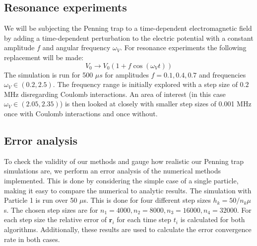 \documentclass[english,notitlepage,reprint,nofootinbib]{revtex4-1}  %
\begin{document}
\subsection*{Resonance experiments}
We will be subjecting the Penning trap to a time-dependent electromagnetic field by adding a time-dependent perturbation
to the electric potential with a constant amplitude $f$ and angular frequency $\omega_V$. For resonance experiments the
following replacement will be made:
\begin{equation}
    V_0 \rightarrow V_0 (1 + f \cos(\omega_V t) )
\end{equation}
The simulation is run for 500 $\mu s$ for amplitudes $ f = 0.1, 0.4, 0.7$ and frequencies $\omega_V \in (0.2,2.5)$. The frequency
range is initially explored with a step size of $0.2$ MHz disregarding Coulomb interactions. An area of interest (in this case $\omega_V \in (2.05,2.35)$)
is then
looked at closely with smaller step sizes of 0.001 MHz once with Coulomb interactions and once without.

\subsection*{Error analysis}
To check the validity of our methods and gauge how realistic our Penning trap simulations are, we perform an error analysis of the
numerical methods implemented. This is done by considering the simple case of a single particle, making it easy to compare the numerical
to analytic results. The simulation with Particle 1 is run over 50 $\mu$s. This is done for four different step sizes $h_k = 50 / n_k \mu$s.
The chosen step sizes are for $n_1 = 4000, n_2 = 8000, n_3 = 16000, n_4 = 32000$. For each step size the relative error of $\textbf{r}_i$
for each time step $t_i$ is calculated for both algorithms.
Additionally, these results are used to calculate the error convergence rate in both cases.
\end{document}
